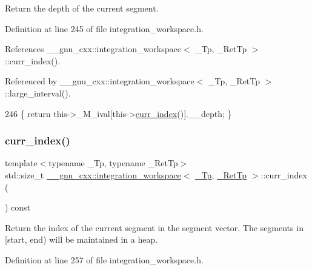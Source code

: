Return the depth of the current segment. 

Definition at line 245 of file integration\+\_\+workspace.\+h.



References \+\_\+\+\_\+gnu\+\_\+cxx\+::integration\+\_\+workspace$<$ \+\_\+\+Tp, \+\_\+\+Ret\+Tp $>$\+::curr\+\_\+index().



Referenced by \+\_\+\+\_\+gnu\+\_\+cxx\+::integration\+\_\+workspace$<$ \+\_\+\+Tp, \+\_\+\+Ret\+Tp $>$\+::large\+\_\+interval().


\begin{DoxyCode}
246       \{ \textcolor{keywordflow}{return} this->\_M\_ival[this->\hyperlink{class____gnu__cxx_1_1integration__workspace_a51a384b1777615943add69f1895454f5}{curr\_index}()].\_\_depth; \}
\end{DoxyCode}
\mbox{\label{class____gnu__cxx_1_1integration__workspace_a51a384b1777615943add69f1895454f5}} 
\subsubsection{\texorpdfstring{curr\+\_\+index()}{curr\_index()}}
{\footnotesize\ttfamily template$<$typename \+\_\+\+Tp, typename \+\_\+\+Ret\+Tp$>$ \\
std\+::size\+\_\+t \hyperlink{class____gnu__cxx_1_1integration__workspace}{\+\_\+\+\_\+gnu\+\_\+cxx\+::integration\+\_\+workspace}$<$ \hyperlink{namespace____gnu__cxx_a3b19a9c800ca194374ef9172290f7d79}{\+\_\+\+Tp}, \hyperlink{namespace____gnu__cxx_a886e03ece3d53ff7fa6c098a40f93fa5}{\+\_\+\+Ret\+Tp} $>$\+::curr\+\_\+index (\begin{DoxyParamCaption}{ }\end{DoxyParamCaption}) const\hspace{0.3cm}{\ttfamily [inline]}}

Return the index of the current segment in the segment vector. The segments in \mbox{[}start, end) will be maintained in a heap. 

Definition at line 257 of file integration\+\_\+workspace.\+h.



